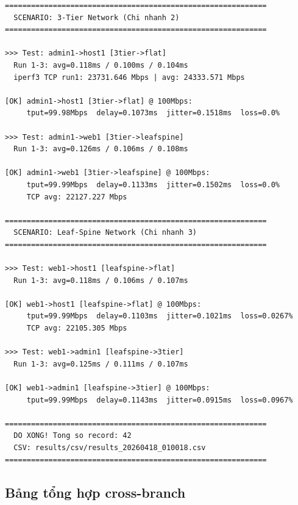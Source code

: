\begin{lstlisting}[style=termstyle, caption={Log đo lường cross-branch -- từ 3-Tier và Leaf-Spine}]
============================================================
  SCENARIO: 3-Tier Network (Chi nhanh 2)
============================================================

>>> Test: admin1->host1 [3tier->flat]
  Run 1-3: avg=0.118ms / 0.100ms / 0.104ms
  iperf3 TCP run1: 23731.646 Mbps | avg: 24333.571 Mbps

[OK] admin1->host1 [3tier->flat] @ 100Mbps:
     tput=99.98Mbps  delay=0.1073ms  jitter=0.1518ms  loss=0.0%

>>> Test: admin1->web1 [3tier->leafspine]
  Run 1-3: avg=0.126ms / 0.106ms / 0.108ms

[OK] admin1->web1 [3tier->leafspine] @ 100Mbps:
     tput=99.99Mbps  delay=0.1133ms  jitter=0.1502ms  loss=0.0%
     TCP avg: 22127.227 Mbps

============================================================
  SCENARIO: Leaf-Spine Network (Chi nhanh 3)
============================================================

>>> Test: web1->host1 [leafspine->flat]
  Run 1-3: avg=0.118ms / 0.106ms / 0.107ms

[OK] web1->host1 [leafspine->flat] @ 100Mbps:
     tput=99.99Mbps  delay=0.1103ms  jitter=0.1021ms  loss=0.0267%
     TCP avg: 22105.305 Mbps

>>> Test: web1->admin1 [leafspine->3tier]
  Run 1-3: avg=0.125ms / 0.111ms / 0.107ms

[OK] web1->admin1 [leafspine->3tier] @ 100Mbps:
     tput=99.99Mbps  delay=0.1143ms  jitter=0.0915ms  loss=0.0967%

============================================================
  DO XONG! Tong so record: 42
  CSV: results/csv/results_20260418_010018.csv
============================================================
\end{lstlisting}

\subsection{Bảng tổng hợp cross-branch}

